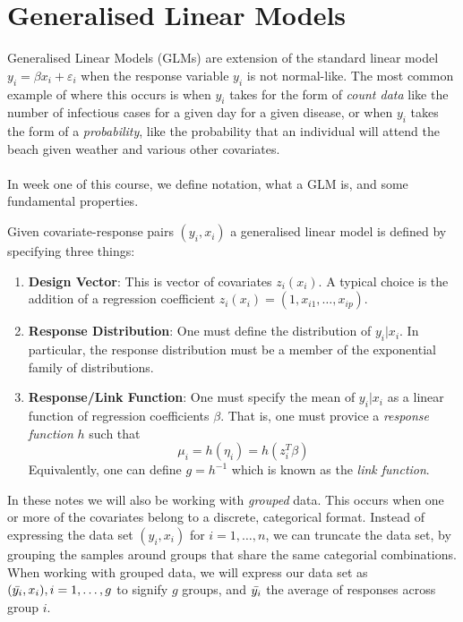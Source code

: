 
\section{Generalised Linear Models}


Generalised Linear Models (GLMs) are extension of the standard linear model $y_i = \beta x_i + \varepsilon_i$ when the response variable $y_i$ is not normal-like. The most common example of where this occurs is when $y_i$ takes for the form of \textit{count data} like the number of infectious cases for a given day for a given disease, or when $y_i$ takes the form of a \textit{probability}, like the probability that an individual will attend the beach given weather and various other covariates. \\
\\
In week one of this course, we define notation, what a GLM is, and some fundamental properties.

\begin{definition} Given covariate-response pairs $(y_i, x_i)$ a generalised linear model is defined by specifying three things:
\begin{enumerate}
    \item \textbf{Design Vector}: This is vector of covariates $z_i(x_i)$. A typical choice is the addition of a regression coefficient $z_i(x_i) = (1, x_{i1}, \dots, x_{ip})$. 

    \item \textbf{Response Distribution}: One must define the distribution of $y_i | x_i$. In particular, the response distribution must be a member of the exponential family of distributions. 
    
    \item \textbf{Response/Link Function}: One must specify the mean of $y_i | x_i$ as a linear function of regression coefficients $\beta$. That is, one must provice a \textit{response function} $h$ such that 
    $$\mu_i = h(\eta_i) = h(z_i^T\beta)$$
    Equivalently, one can define $g = h^{-1}$ which is known as the \textit{link function}.
\end{enumerate}
\end{definition}
\vspace{10pt}
In these notes we will also be working with \textit{grouped} data. This occurs when one or more of the covariates belong to a discrete, categorical format. Instead of expressing the data set $(y_i, x_i)$ for $i=1,\dots,n$, we can truncate the data set, by grouping the samples around groups that share the same categorial combinations. When working with grouped data, we will express our data set as $(\Bar{y_i}, x_i), i=1,\dots,g$ to signify $g$ groups, and $\Bar{y_i}$ the average of responses across group $i$.

